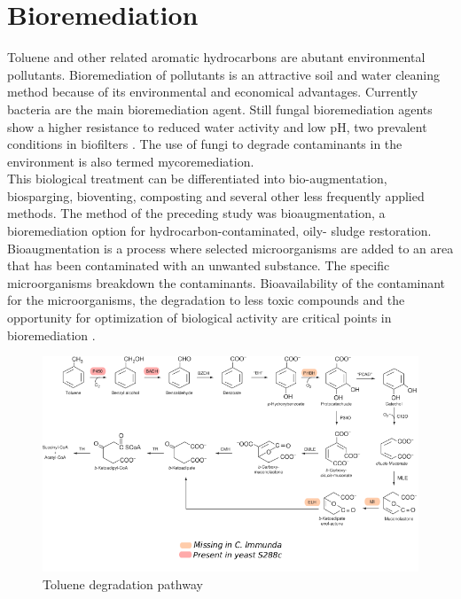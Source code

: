 \documentclass[12pt, a4paper]{report}
\begin{document}
\section{Bioremediation}
Toluene and other related aromatic hydrocarbons are abutant environmental pollutants. Bioremediation of pollutants is an attractive soil and water cleaning method because of its environmental and economical advantages. Currently bacteria are the main bioremediation agent.   Still fungal bioremediation agents show a higher resistance to reduced water activity and low pH, two prevalent conditions in biofilters \cite{Luykx2003}. The use of fungi to degrade contaminants in the environment is also termed mycoremediation.\\
This biological treatment can be differentiated into bio-augmentation, biosparging, bioventing, composting and several other less frequently applied methods. The method of the preceding study was bioaugmentation, a bioremediation option for hydrocarbon-contaminated, oily- sludge restoration. Bioaugmentation is a process where selected microorganisms are added to an area that has been contaminated with an unwanted substance. The specific microorganisms breakdown the contaminants. Bioavailability of the contaminant for the microorganisms, the degradation to less toxic compounds and the opportunity for optimization of biological activity are critical points in bioremediation \cite{Poyntner2014}.  \\

\begin{figure}[H]
	\centering	
	\includegraphics[width=360pt]{pics/toluenpathway.png}
	\caption[Toluene degradation pathway]
	{Toluene degradation pathway \cite{Parales2008}}
	\label{Toluendeg}
\end{figure}
\end{document}
